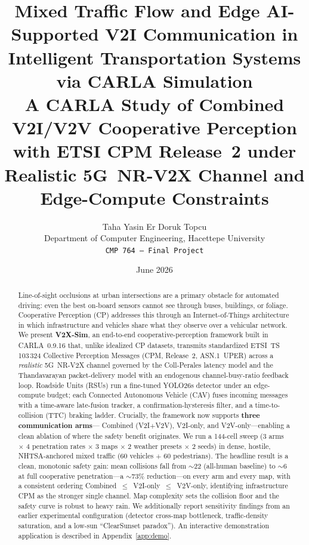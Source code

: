 \documentclass[11pt]{article}
\title{\vspace{-1.0em}\textbf{Mixed Traffic Flow and Edge AI-Supported V2I Communication
in Intelligent Transportation Systems via CARLA Simulation}\\[0.45em]
\large A CARLA Study of Combined V2I/V2V Cooperative Perception with ETSI CPM
Release~2 under Realistic 5G~NR-V2X Channel and Edge-Compute Constraints}
\author{Taha Yasin Er \qquad Doruk Topcu\\[0.3em]
Department of Computer Engineering, Hacettepe University\\
\texttt{CMP\,764 -- Final Project}}
\date{June 2026}
\begin{document}
\maketitle

\begin{abstract}
\noindent Line-of-sight occlusions at urban intersections are a primary obstacle for
automated driving: even the best on-board sensors cannot see through buses,
buildings, or foliage. Cooperative Perception (CP) addresses this through an
Internet-of-Things architecture in which infrastructure and vehicles share what
they observe over a vehicular network. We present \textbf{V2X-Sim}, an end-to-end
cooperative-perception framework built in CARLA~0.9.16 that, unlike idealized CP
datasets, transmits standardized \mbox{ETSI~TS\,103\,324} Collective Perception
Messages (CPM, Release~2, ASN.1~UPER) across a \emph{realistic} 5G~NR-V2X channel
governed by the Coll-Perales latency model and the Thandavarayan packet-delivery
model with an endogenous channel-busy-ratio feedback loop. Roadside Units (RSUs)
run a fine-tuned YOLO26s detector under an edge-compute budget; each Connected
Autonomous Vehicle (CAV) fuses incoming messages with a time-aware late-fusion
tracker, a confirmation-hysteresis filter, and a time-to-collision (TTC) braking
ladder. Crucially, the framework now supports \textbf{three communication arms}---%
Combined (V2I$+$V2V), V2I-only, and V2V-only---enabling a clean ablation of where
the safety benefit originates. We run a 144-cell sweep (3 arms $\times$ 4
penetration rates $\times$ 3 maps $\times$ 2 weather presets $\times$ 2 seeds) in
dense, hostile, NHTSA-anchored mixed traffic (60 vehicles $+$ 60 pedestrians). The
headline result is a clean, monotonic safety gain: mean collisions fall from
$\sim$22 (all-human baseline) to $\sim$6 at full cooperative penetration---a
$\sim$73\% reduction---on every arm and every map, with a consistent ordering
\mbox{Combined $\leq$ V2I-only $\leq$ V2V-only}, identifying infrastructure CPM as
the stronger single channel. Map complexity sets the collision floor and the
safety curve is robust to heavy rain. We additionally report sensitivity findings
from an earlier experimental configuration (detector cross-map bottleneck,
traffic-density saturation, and a low-sun ``ClearSunset paradox''). An interactive
demonstration application is described in Appendix~\ref{app:demo}.
\end{abstract}

\end{document}
